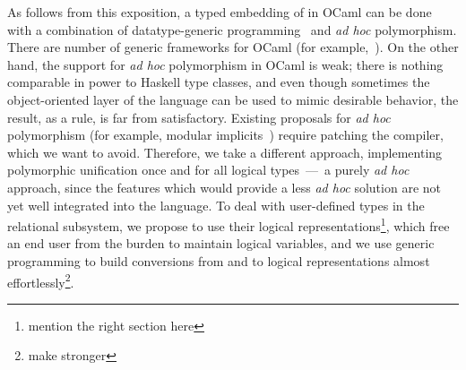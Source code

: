 As follows from this exposition, a typed embedding of \miniKanren in OCaml can be done with
a combination of datatype-generic programming~\cite{DGP} and \emph{ad hoc} polymorphism. There are 
number of generic frameworks for OCaml (for example,~\cite{Deriving}). On the other hand, the support
for \emph{ad hoc} polymorphism in OCaml is weak; there is nothing comparable in power to Haskell
type classes, and even though sometimes the object-oriented layer of the language can be used to mimic
desirable behavior, the result, as a rule, is far from satisfactory. Existing proposals for \emph{ad hoc} polymorphism (for example,
modular implicits~\cite{Implicits}) require patching the compiler, which we want to avoid. Therefore, we 
take a different approach, implementing polymorphic unification once and for all logical types~---~a purely \emph{ad hoc} 
approach, since the features which would provide a less \emph{ad hoc} solution are not yet well integrated into the language. To deal
with user-defined types in the relational subsystem, we propose to use their logical representations\footnote{mention the right section here}, which free an end user
from the burden to maintain logical variables, and we use generic programming to build conversions from and to logical
representations almost effortlessly\footnote{make stronger}.



